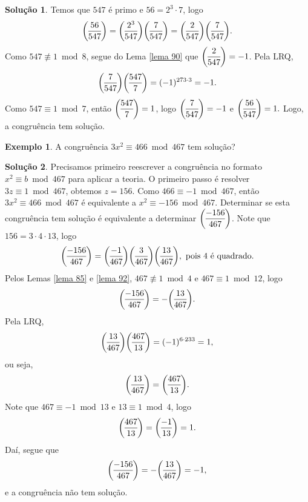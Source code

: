 \documentclass[a4paper,11pt,twoside, leqno]{article}
\newcommand{\genlegendre}[4]{%
	\genfrac{(}{)}{}{#1}{#3}{#4}%
	\if\relax\detokenize{#2}\relax\else_{\!#2}\fi
}
\newcommand{\legendre}[3][]{\genlegendre{}{#1}{#2}{#3}}
\theoremstyle{definition}
\newtheorem*{example}{Exemplo}
\newtheorem*{solution}{Solução}
\begin{document}
\begin{solution}
	Temos que $547$ é primo e $56 = 2^3\cdot 7$, logo
	\begin{align*}
	\legendre[]{56}{547} = \legendre[]{2^3}{547}\legendre[]{7}{547} = \legendre[]{2}{547}\legendre[]{7}{547}.
	\end{align*}
	Como $547\not\equiv 1\bmod 8$, segue do Lema \eqref{lema 90} que $\displaystyle{\legendre[]{2}{547} = -1}$. Pela LRQ,
	\begin{align*}
	\legendre[]{7}{547}\legendre[]{547}{7} = (-1)^{273\cdot 3} = -1.
	\end{align*}
	Como $547\equiv 1\bmod 7$, então $\displaystyle{\legendre[]{547}{7} = 1}$, logo $\displaystyle{\legendre[]{7}{547} = -1}$ e $\displaystyle{\legendre[]{56}{547} = 1}.$ Logo, a congruência tem solução.
\end{solution}
\begin{example}
	A congruência $3x^2\equiv 466\bmod 467$ tem solução?
\end{example}
\begin{solution}
	Precisamos primeiro reescrever a congruência no formato $x^2\equiv b\bmod 467$ para aplicar a teoria. O primeiro passo é resolver $3z\equiv 1\bmod 467$, obtemos $z = 156$. Como $466\equiv -1\bmod 467$, então $3x^2\equiv 466\bmod 467$ é equivalente a $x^2\equiv -156\bmod 467$. Determinar se esta congruência tem solução é equivalente a determinar $\displaystyle{\legendre[]{-156}{467}}$. Note que $156 = 3\cdot 4\cdot 13$, logo
	\begin{align*}
	\legendre[]{-156}{467} = \legendre[]{-1}{467}\legendre[]{3}{467}\legendre[]{13}{467}, \text{ pois } 4 \text{ é quadrado.}
	\end{align*}
	Pelos Lemas \eqref{lema 85} e \eqref{lema 92}, $467\not\equiv 1\bmod 4$ e $467\equiv 1\bmod 12$, logo
	\begin{align*}
	\legendre[]{-156}{467} = -\legendre[]{13}{467}.
	\end{align*}
	Pela LRQ,
	\begin{align*}
	\legendre[]{13}{467}\legendre[]{467}{13} = (-1)^{6\cdot 233} = 1,
	\end{align*}
	ou seja,
	\begin{align*}
	\legendre[]{13}{467} = \legendre[]{467}{13}.
	\end{align*}
	Note que $467\equiv -1\bmod 13$ e $13\equiv 1\bmod 4$, logo
	\begin{align*}
	\legendre[]{467}{13} = \legendre[]{-1}{13} = 1.
	\end{align*}
	Daí, segue que
	\begin{align*}
	\legendre[]{-156}{467} = -\legendre[]{13}{467} = -1,
	\end{align*}
	e a congruência não tem solução.
\end{solution}
\end{document}
